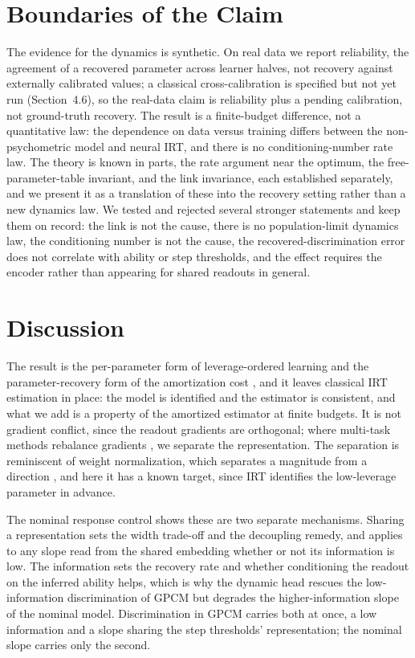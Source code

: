 \documentclass[twocolumn,10pt]{article}
\begin{document}
\section{Boundaries of the Claim}
The evidence for the dynamics is synthetic. On real data we report reliability, the agreement
of a recovered parameter across learner halves, not recovery against externally calibrated
values; a classical cross-calibration is specified but not yet run (Section~4.6), so the
real-data claim is reliability plus a pending calibration, not ground-truth recovery. The
result is a finite-budget difference, not a quantitative law: the dependence on data versus
training differs between the non-psychometric model and neural IRT, and there is no
conditioning-number rate law. The theory is known in parts, the rate argument near the
optimum, the free-parameter-table invariant, and the link invariance, each established
separately, and we present it as a translation of these into the recovery setting rather than
a new dynamics law. We tested and rejected several stronger statements and keep them on
record: the link is not the cause, there is no population-limit dynamics law, the conditioning
number is not the cause, the recovered-discrimination error does not correlate with ability or
step thresholds, and the effect requires the encoder rather than appearing for shared readouts
in general.

\section{Discussion}
The result is the per-parameter form of leverage-ordered learning \citep{saxe2014} and the
parameter-recovery form of the amortization cost \citep{cremer2018}, and it leaves classical
IRT estimation in place: the model is identified and the estimator is consistent, and what
we add is a property of the amortized estimator at finite budgets. It is not gradient
conflict, since the readout gradients are orthogonal; where multi-task methods rebalance
gradients \citep{chen2018,yu2020}, we separate the representation. The separation is
reminiscent of weight normalization, which separates a magnitude from a direction
\citep{salimans2016}, and here it has a known target, since IRT identifies the low-leverage
parameter in advance.

The nominal response control shows these are two separate mechanisms. Sharing a
representation sets the width trade-off and the decoupling remedy, and applies to any slope
read from the shared embedding whether or not its information is low. The information sets
the recovery rate and whether conditioning the readout on the inferred ability helps, which
is why the dynamic head rescues the low-information discrimination of GPCM but degrades the
higher-information slope of the nominal model. Discrimination in GPCM carries both at once, a
low information and a slope sharing the step thresholds' representation; the nominal slope
carries only the second.
\end{document}
